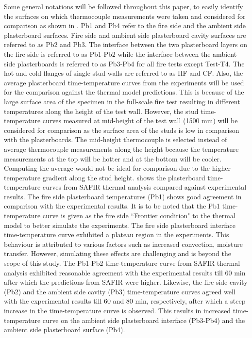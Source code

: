 Some general notations will be followed throughout this paper, to easily identify the surfaces on which thermocouple measurements were taken and considered for comparison as shown in . Pb1 and Pb4 refer to the fire side and the ambient side plasterboard surfaces. Fire side and ambient side plasterboard cavity surfaces are referred to as Pb2 and Pb3. The interface between the two plasterboard layers on the fire side is referred to as Pb1-Pb2 while the interface between the ambient side plasterboards is referred to as Pb3-Pb4 for all fire tests except Test-T4. The hot and cold flanges of single stud walls are referred to as HF and CF. Also, the average plasterboard time-temperature curves from the experiments will be used for the comparison against the thermal model predictions. This is because of the large surface area of the specimen in the full-scale fire test resulting in different temperatures along the height of the test wall. However, the stud time-temperature curves measured at mid-height of the test wall (1500 mm) will be considered for comparison as the surface area of the studs is low in comparison with the plasterboards. The mid-height thermocouple is selected instead of average thermocouple measurements along the height because the temperature measurements at the top will be hotter and at the bottom will be cooler. Computing the average would not be ideal for comparison due to the higher temperature gradient along the stud height.  shows the plasterboard time-temperature curves from SAFIR thermal analysis compared against experimental results. The fire side plasterboard temperatures (Pb1) shows good agreement in comparison with the experimental results. It is to be noted that the Pb1 time-temperature curve is given as the fire side ``Frontier condition" to the thermal model to better simulate the experiments. The fire side plasterboard interface time-temperature curve exhibited a plateau region in the experiments. This behaviour is attributed to various factors such as increased convection, moisture transfer. However, simulating these effects are challenging and is beyond the scope of this study. The Pb1-Pb2 time-temperature curve from SAFIR thermal analysis exhibited reasonable agreement with the experimental results till 60 min after which the predictions from SAFIR were higher. Likewise, the fire side cavity (Pb2) and the ambient side cavity (Pb3) time-temperature curves agreed well with the experimental results till 60 and 80 min, respectively, after which a steep increase in the time-temperature curve is observed. This results in increased time-temperature curve on the ambient side plasterboard interface (Pb3-Pb4) and the ambient side plasterboard surface (Pb4). 
